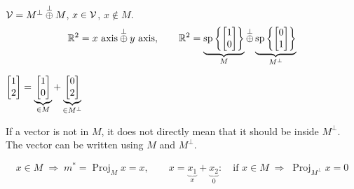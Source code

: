 \begin{note}
$\mathcal{V} = M^\perp \overset{\perp}{\oplus} M$, \quad $x\in \mathcal{V}$, \quad $x\notin M$.
\[
\mathbb{R}^2 = x\text{ axis} \overset{\perp}{\oplus} y \text{ axis}, \qquad
\mathbb{R}^2 = \underbrace{\operatorname{sp}\left\{\begin{bmatrix}1\\0\end{bmatrix}\right\}}_{M} \overset{\perp}{\oplus} \underbrace{\operatorname{sp}\left\{\begin{bmatrix}0\\1\end{bmatrix}\right\}}_{M^\perp}
\]
\begin{center}
\qquad\qquad
$\displaystyle \begin{bmatrix}1\\2\end{bmatrix} = \underbrace{\begin{bmatrix}1\\0\end{bmatrix}}_{\in M} + \underbrace{\begin{bmatrix}0\\2\end{bmatrix}}_{\in M^\perp}$
\end{center}
If a vector is not in $M$, it does not directly mean that it should be inside $M^\perp$. The vector can be written using $M$ and $M^\perp$.
\end{note}

\[
x\in M \;\Rightarrow\; m^* = \operatorname{Proj}_M x = x,
\qquad
x = \underbrace{x_1}_{x} + \underbrace{x_2}_{0}: \quad \text{if } x\in M \;\Rightarrow\; \operatorname{Proj}_{M^\perp} x = 0
\]

